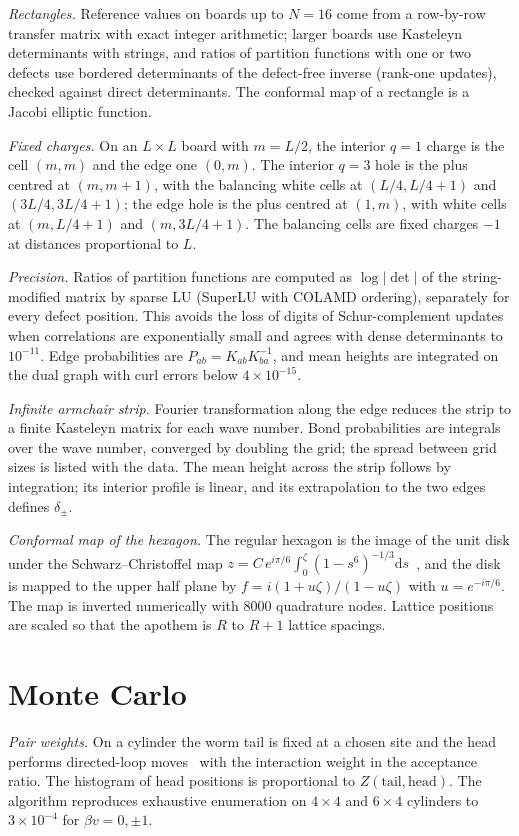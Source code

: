 \documentclass[aps,pre,twocolumn,superscriptaddress,nofootinbib,floatfix]{revtex4-2}
\newcommand{\dd}{\mathrm{d}}
\begin{document}
\emph{Rectangles.} Reference values on boards up to $N=16$ come from a row-by-row transfer matrix with exact integer arithmetic; larger boards use Kasteleyn determinants with strings, and ratios of partition functions with one or two defects use bordered determinants of the defect-free inverse (rank-one updates), checked against direct determinants. The conformal map of a rectangle is a Jacobi elliptic function.

\emph{Fixed charges.} On an $L\times L$ board with $m=L/2$, the interior $q=1$ charge is the cell $(m,m)$ and the edge one $(0,m)$. The interior $q=3$ hole is the plus centred at $(m,m+1)$, with the balancing white cells at $(L/4,L/4+1)$ and $(3L/4,3L/4+1)$; the edge hole is the plus centred at $(1,m)$, with white cells at $(m,L/4+1)$ and $(m,3L/4+1)$. The balancing cells are fixed charges $-1$ at distances proportional to $L$.

\emph{Precision.} Ratios of partition functions are computed as $\log|\det|$ of the string-modified matrix by sparse LU (SuperLU with COLAMD ordering), separately for every defect position. This avoids the loss of digits of Schur-complement updates when correlations are exponentially small and agrees with dense determinants to $10^{-11}$. Edge probabilities are $P_{ab}=K_{ab}K^{-1}_{ba}$, and mean heights are integrated on the dual graph with curl errors below $4\times10^{-15}$.

\emph{Infinite armchair strip.} Fourier transformation along the edge reduces the strip to a finite Kasteleyn matrix for each wave number. Bond probabilities are integrals over the wave number, converged by doubling the grid; the spread between grid sizes is listed with the data. The mean height across the strip follows by integration; its interior profile is linear, and its extrapolation to the two edges defines $\delta_\pm$.

\emph{Conformal map of the hexagon.} The regular hexagon is the image of the unit disk under the Schwarz--Christoffel map $z=C\,e^{i\pi/6}\int_0^{\zeta}(1-s^6)^{-1/3}\dd s$~\cite{DriscollTrefethen2002}, and the disk is mapped to the upper half plane by $f=i(1+u\zeta)/(1-u\zeta)$ with $u=e^{-i\pi/6}$. The map is inverted numerically with $8000$ quadrature nodes. Lattice positions are scaled so that the apothem is $R$ to $R+1$ lattice spacings.


\section{Monte Carlo}
\label{app:mc}
\emph{Pair weights.} On a cylinder the worm tail is fixed at a chosen site and the head performs directed-loop moves~\cite{SandvikMoessner2006,Alet2006} with the interaction weight in the acceptance ratio. The histogram of head positions is proportional to $Z(\text{tail},\text{head})$. The algorithm reproduces exhaustive enumeration on $4\times4$ and $6\times4$ cylinders to $3\times10^{-4}$ for $\beta v=0,\pm1$.
\end{document}
